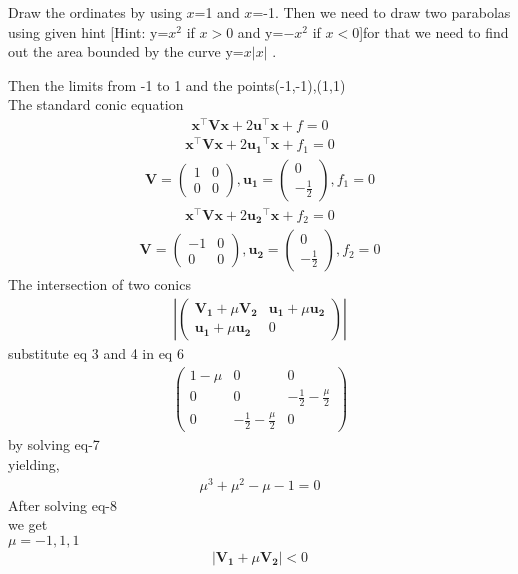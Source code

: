 \documentclass[10pt, a4paper]{article}
\newcommand{\myvec}[1]{\ensuremath{\begin{pmatrix}#1\end{pmatrix}}}
\let\vec\mathbf
\begin{document}
\raggedright\large{ Draw the ordinates by using $x$=1 and $x$=-1. Then we need to draw  two parabolas using  given hint [Hint: y=$x^2$ if $x>0$  and y=$-x^2$ if $x<0$]for that we need to find out the area bounded by the curve  y=$x|x|$  .}
\vspace{2mm}\\
\raggedright\large{Then the limits from -1 to 1  and the points(-1,-1),(1,1)}\vspace{2mm}\\
The standard conic equation\\
\begin{align}
\vec{x}^{\top}\vec{V}\vec{x}+2\vec{u}^{\top}\vec{x}+f=0
\end{align}
\begin{align}
\vec{x}^{\top}\vec{V}\vec{x}+2\vec{u_1}^{\top}\vec{x}+f_1=0
\end{align}
\begin{align}
\vec{V}=\myvec{1&0\\0&0} ,\vec{u_1}=\myvec{0\\-\frac{1}{2}},  f_1=0
\end{align}
\begin{align}
\vec{x}^{\top}\vec{V}\vec{x}+2\vec{u_2}^{\top}\vec{x}+f_2=0
\end{align}
\begin{align}
\vec{V}=\myvec{-1&0\\0&0} ,\vec{u_2}=\myvec{0\\-\frac{1}{2}},  f_2=0
\end{align}
The intersection of two conics\\
\begin{align}
|\myvec{\vec{V_1}+\mu{\vec{V_2}}&\vec{u_1}+\mu{\vec{u_2}}\\\vec{u_1}+\mu{\vec{u_2}}&0}|
\end{align}
substitute eq 3 and 4 in eq 6\\
\begin{align}
\myvec{1-\mu&0&0\\0&0&-\frac{1}{2}-\frac{\mu}{2}\\0&-\frac{1}{2}-\frac{\mu}{2}&0}
\end{align}
by solving eq-7 \\
yielding,
\begin{align}
\mu^3+\mu^2-\mu-1=0
\end{align}
After solving eq-8\\
we get\\
$\mu=-1,1,1$
\begin{align}
|\vec{V_1}+\mu\vec{V_2}|<0
\end{align}
\end{document}
